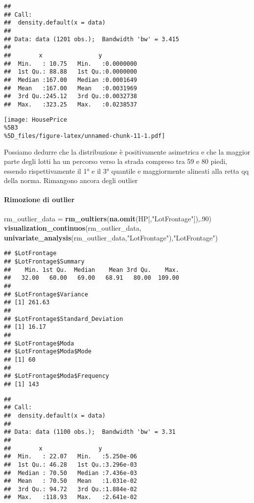 \documentclass[
]{article}
\newenvironment{Shaded}{\begin{snugshade}}{\end{snugshade}}
\newcommand{\DecValTok}[1]{\textcolor[rgb]{0.00,0.00,0.81}{#1}}
\newcommand{\FunctionTok}[1]{\textcolor[rgb]{0.13,0.29,0.53}{\textbf{#1}}}
\newcommand{\NormalTok}[1]{#1}
\newcommand{\OtherTok}[1]{\textcolor[rgb]{0.56,0.35,0.01}{#1}}
\newcommand{\StringTok}[1]{\textcolor[rgb]{0.31,0.60,0.02}{#1}}
\begin{document}
\begin{verbatim}
## 
## Call:
##  density.default(x = data)
## 
## Data: data (1201 obs.);  Bandwidth 'bw' = 3.415
## 
##        x                y            
##  Min.   : 10.75   Min.   :0.0000000  
##  1st Qu.: 88.88   1st Qu.:0.0000000  
##  Median :167.00   Median :0.0001649  
##  Mean   :167.00   Mean   :0.0031969  
##  3rd Qu.:245.12   3rd Qu.:0.0032738  
##  Max.   :323.25   Max.   :0.0238537
\end{verbatim}

\texttt{[image: HousePrice\\\%5B3\\\%5D\_files/figure-latex/unnamed-chunk-11-1.pdf]}

Possiamo dedurre che la distribuzione è positivamente asimetrica e che
la maggior parte degli lotti ha un percorso verso la strada compreso tra
59 e 80 piedi, essendo rispettivamente il 1° e il 3° quantile e
maggiormente alineati alla retta qq della norma. Rimangono ancora degli
outlier

\paragraph{Rimozione di outlier}\label{rimozione-di-outlier}

\begin{Shaded}
\begin{Highlighting}[]
\NormalTok{rm\_outlier\_data }\OtherTok{=} \FunctionTok{rm\_oultiers}\NormalTok{(}\FunctionTok{na.omit}\NormalTok{(HP[,}\StringTok{"LotFrontage"}\NormalTok{]),.}\DecValTok{90}\NormalTok{)}
\FunctionTok{visualization\_continuos}\NormalTok{(rm\_outlier\_data, }\FunctionTok{univariate\_analysis}\NormalTok{(rm\_outlier\_data,}\StringTok{"LotFrontage"}\NormalTok{),}\StringTok{"LotFrontage"}\NormalTok{)}
\end{Highlighting}
\end{Shaded}

\begin{verbatim}
## $LotFrontage
## $LotFrontage$Summary
##    Min. 1st Qu.  Median    Mean 3rd Qu.    Max. 
##   32.00   60.00   69.00   68.91   80.00  109.00 
## 
## $LotFrontage$Variance
## [1] 261.63
## 
## $LotFrontage$Standard_Deviation
## [1] 16.17
## 
## $LotFrontage$Moda
## $LotFrontage$Moda$Mode
## [1] 60
## 
## $LotFrontage$Moda$Frequency
## [1] 143
\end{verbatim}

\begin{verbatim}
## 
## Call:
##  density.default(x = data)
## 
## Data: data (1100 obs.);  Bandwidth 'bw' = 3.31
## 
##        x                y            
##  Min.   : 22.07   Min.   :5.250e-06  
##  1st Qu.: 46.28   1st Qu.:3.296e-03  
##  Median : 70.50   Median :7.436e-03  
##  Mean   : 70.50   Mean   :1.031e-02  
##  3rd Qu.: 94.72   3rd Qu.:1.884e-02  
##  Max.   :118.93   Max.   :2.641e-02
\end{verbatim}
\end{document}

